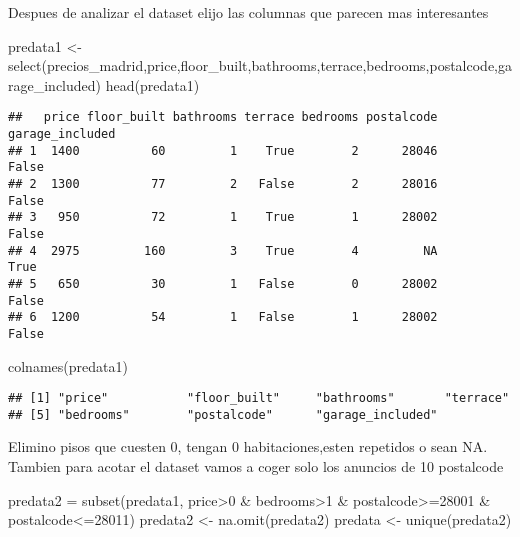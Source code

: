 \documentclass[
]{article}
\newenvironment{Shaded}{\begin{snugshade}}{\end{snugshade}}
\newcommand{\DecValTok}[1]{\textcolor[rgb]{0.00,0.00,0.81}{#1}}
\newcommand{\FunctionTok}[1]{\textcolor[rgb]{0.00,0.00,0.00}{#1}}
\newcommand{\NormalTok}[1]{#1}
\newcommand{\OtherTok}[1]{\textcolor[rgb]{0.56,0.35,0.01}{#1}}
\newcommand{\SpecialCharTok}[1]{\textcolor[rgb]{0.00,0.00,0.00}{#1}}
\begin{document}
Despues de analizar el dataset elijo las columnas que parecen mas
interesantes

\begin{Shaded}
\begin{Highlighting}[]
\NormalTok{predata1 }\OtherTok{\textless{}{-}} \FunctionTok{select}\NormalTok{(precios\_madrid,price,floor\_built,bathrooms,terrace,bedrooms,postalcode,garage\_included)}
\FunctionTok{head}\NormalTok{(predata1)}
\end{Highlighting}
\end{Shaded}

\begin{verbatim}
##   price floor_built bathrooms terrace bedrooms postalcode garage_included
## 1  1400          60         1    True        2      28046           False
## 2  1300          77         2   False        2      28016           False
## 3   950          72         1    True        1      28002           False
## 4  2975         160         3    True        4         NA            True
## 5   650          30         1   False        0      28002           False
## 6  1200          54         1   False        1      28002           False
\end{verbatim}

\begin{Shaded}
\begin{Highlighting}[]
\FunctionTok{colnames}\NormalTok{(predata1)}
\end{Highlighting}
\end{Shaded}

\begin{verbatim}
## [1] "price"           "floor_built"     "bathrooms"       "terrace"        
## [5] "bedrooms"        "postalcode"      "garage_included"
\end{verbatim}

Elimino pisos que cuesten 0, tengan 0 habitaciones,esten repetidos o
sean NA. Tambien para acotar el dataset vamos a coger solo los anuncios
de 10 postalcode

\begin{Shaded}
\begin{Highlighting}[]
\NormalTok{predata2 }\OtherTok{=} \FunctionTok{subset}\NormalTok{(predata1, price}\SpecialCharTok{\textgreater{}}\DecValTok{0} \SpecialCharTok{\&}\NormalTok{ bedrooms}\SpecialCharTok{\textgreater{}}\DecValTok{1} \SpecialCharTok{\&}\NormalTok{ postalcode}\SpecialCharTok{\textgreater{}=}\DecValTok{28001} \SpecialCharTok{\&}\NormalTok{ postalcode}\SpecialCharTok{\textless{}=}\DecValTok{28011}\NormalTok{)}
\NormalTok{predata2 }\OtherTok{\textless{}{-}} \FunctionTok{na.omit}\NormalTok{(predata2)}
\NormalTok{predata }\OtherTok{\textless{}{-}} \FunctionTok{unique}\NormalTok{(predata2)}
\end{Highlighting}
\end{Shaded}
\end{document}

